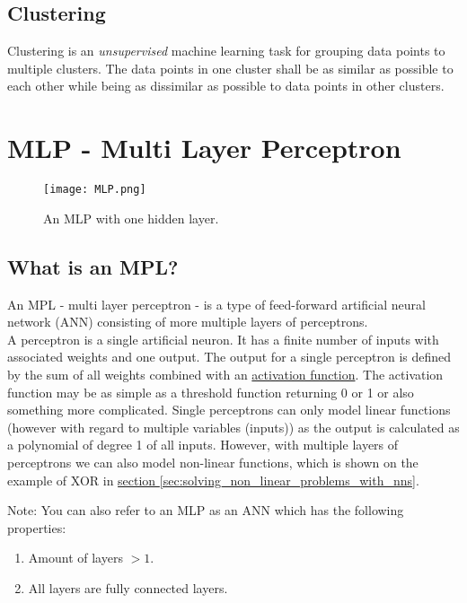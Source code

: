 \subsection{Clustering}

Clustering is an \textit{unsupervised} machine learning task for grouping data points to multiple clusters. The data points in one cluster shall be as similar as possible to each other while being as dissimilar as possible to data points in other clusters.

\section{MLP - Multi Layer Perceptron}

\begin{figure}[h]
    \caption{An MLP with one hidden layer.}
    \centering
    \texttt{[image: MLP.png]}
    \label{fig:mlp}
\end{figure}

\subsection{What is an MPL?}

An MPL - multi layer perceptron - is a type of feed-forward artificial neural network (ANN) consisting of more multiple layers of perceptrons.\\
A perceptron is a single artificial neuron. It has a finite number of inputs with associated weights and one output. The output for a single perceptron is defined by the sum of all weights combined with an \hyperref[sec:activation_functions]{activation function}. The activation function may be as simple as a threshold function returning 0 or 1 or also something more complicated. Single perceptrons can only model linear functions (however with regard to multiple variables (inputs)) as the output is calculated as a polynomial of degree 1 of all inputs. However, with multiple layers of perceptrons we can also model non-linear functions, which is shown on the example of XOR in \hyperref[sec:solving_non_linear_problems_with_nns]{section \ref*{sec:solving_non_linear_problems_with_nns}}.

Note: You can also refer to an MLP as an ANN which has the following properties:
\begin{enumerate}
    \item Amount of layers $> 1$.
    \item All layers are fully connected layers.
\end{enumerate}

